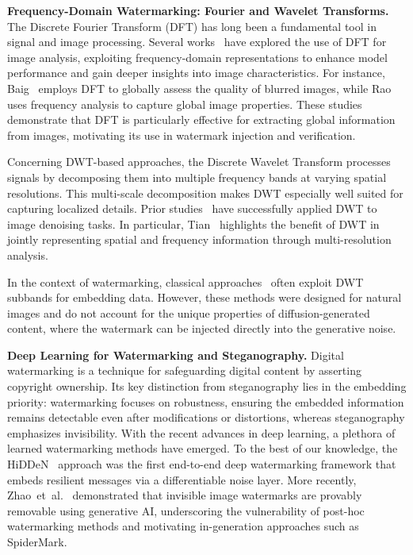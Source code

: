 \noindent\textbf{Frequency-Domain Watermarking: Fourier and Wavelet Transforms.}
The Discrete Fourier Transform (DFT) has long been a fundamental tool in signal and 
image processing. Several works~\cite{jia2023fourier, jiang2021focal, rao2021global, 
yu2022deep} have explored the use of DFT for image analysis, exploiting 
frequency-domain representations to enhance model performance and gain deeper 
insights into image characteristics. For instance, Baig~\cite{baig2022dft} employs 
DFT to globally assess the quality of blurred images, while 
Rao~\cite{rao2021global} uses frequency analysis to capture global image properties. 
These studies demonstrate that DFT is particularly effective for extracting global 
information from images, motivating its use in watermark injection and verification.

Concerning DWT-based approaches, the Discrete Wavelet Transform processes signals 
by decomposing them into multiple frequency bands at varying spatial resolutions. 
This multi-scale decomposition makes DWT especially well suited for capturing 
localized details. Prior studies~\cite{mohideen2008image, pimpalkhute2021digital} have 
successfully applied DWT to image denoising tasks. In particular, 
Tian~\cite{tian2023multi} highlights the benefit of DWT in jointly representing 
spatial and frequency information through multi-resolution analysis.

In the context of watermarking, classical approaches~\cite{barni2001improved,raval2003discrete,shensa2002discrete,tao2004robust} often exploit DWT subbands for embedding 
data. However, these methods were designed for natural images and do not account for 
the unique properties of diffusion-generated content, where the watermark can be 
injected directly into the generative noise.

\noindent\textbf{Deep Learning for Watermarking and Steganography.}
Digital watermarking is a technique for safeguarding digital content by asserting 
copyright ownership. Its key distinction from steganography lies in the embedding 
priority: watermarking focuses on robustness, ensuring the embedded information 
remains detectable even after modifications or distortions, whereas steganography 
emphasizes invisibility. With the recent advances in deep learning, a plethora of 
learned watermarking methods have emerged. To the best of our knowledge, the 
HiDDeN~\cite{zhu2018hidden} approach was the first end-to-end deep watermarking 
framework that embeds resilient messages via a differentiable noise layer. 
More recently, Zhao~et~al.~\cite{zhao2024invisible} demonstrated that invisible 
image watermarks are provably removable using generative AI, underscoring the 
vulnerability of post-hoc watermarking methods and motivating in-generation 
approaches such as SpiderMark.

